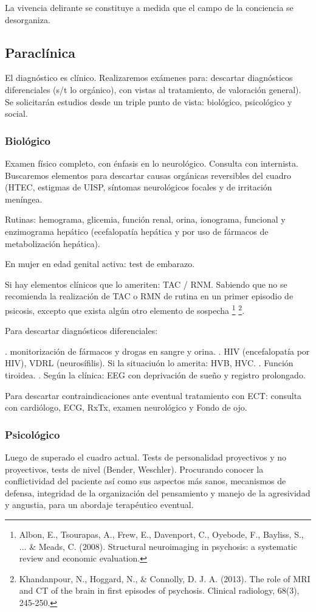La vivencia delirante se constituye a medida que el campo de la conciencia se desorganiza.
\subsection*{Paraclínica}
El diagnóstico es clínico. Realizaremos exámenes para: descartar diagnósticos diferenciales (s/t lo orgánico), con vistas al tratamiento, de valoración general). Se solicitarán estudios desde un triple punto de vista: biológico, psicológico y social.
\subsubsection*{Biológico}
Examen físico completo, con énfasis en lo neurológico. Consulta con internista. Buscaremos elementos para descartar causas orgánicas reversibles del cuadro (HTEC, estigmas de UISP, síntomas neurológicos focales y de irritación meníngea.

Rutinas: hemograma, glicemia, función renal, orina, ionograma, funcional y enzimograma hepático (ecefalopatía hepática y por uso de fármacos de metabolización hepática).

En mujer en edad genital activa: test de embarazo.

Si hay elementos clínicos que lo ameriten: TAC / RNM. Sabiendo que no se recomienda la realización de TAC o RMN de rutina en un primer episodio de psicosis, excepto que exista algún otro elemento de sospecha \footnote{Albon, E., Tsourapas, A., Frew, E., Davenport, C., Oyebode, F., Bayliss, S., ... \& Meads, C. (2008). Structural neuroimaging in psychosis: a systematic review and economic evaluation.} \footnote{Khandanpour, N., Hoggard, N., \& Connolly, D. J. A. (2013). The role of MRI and CT of the brain in first episodes of psychosis. Clinical radiology, 68(3), 245-250.}.

Para descartar diagnósticos diferenciales:

. monitorización de fármacos y drogas en sangre y orina.
. HIV (encefalopatía por HIV), VDRL (neurosífilis).  Si la situaciuón lo amerita: HVB, HVC.
. Función tiroidea.
. Según la clínica: EEG con deprivación de sueño y registro prolongado.

Para descartar contraindicaciones ante eventual tratamiento con ECT: consulta con cardiólogo, ECG, RxTx, examen neurológico y Fondo de ojo.
\subsubsection*{Psicológico}
Luego de superado el cuadro actual. Tests de personalidad proyectivos y no proyectivos, tests de nivel (Bender, Weschler). Procurando conocer la conflictividad del paciente así como sus aspectos más sanos, mecanismos de defensa, integridad de la organización del pensamiento y manejo de la agresividad y angustia, para un abordaje terapéutico eventual.
